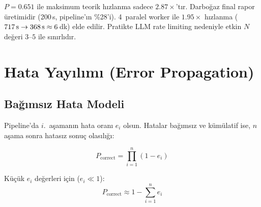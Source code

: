 \begin{dikkat}
$P = 0.651$ ile maksimum teorik h{\i}zlanma sadece $2.87\times$'t{\i}r. Darbo\u{g}az final rapor \"{u}retimidir (200\,s, pipeline'{\i}n \%28'i). 4~paralel worker ile $1.95\times$ h{\i}zlanma ($717\text{\,s} \to 368\text{\,s} \approx 6$\,dk) elde edilir. Pratikte LLM rate limiting nedeniyle etkin $N$ de\u{g}eri $3$--$5$ ile s{\i}n{\i}rl{\i}d{\i}r.
\end{dikkat}


\section{Hata Yay{\i}l{\i}m{\i} (Error Propagation)}
\label{sec:error_propagation}

\subsection{Ba\u{g}{\i}ms{\i}z Hata Modeli}

Pipeline'da $i$.~a\c{s}aman{\i}n hata oran{\i} $e_i$ olsun. Hatalar ba\u{g}{\i}ms{\i}z ve k\"{u}m\"{u}latif ise, $n$ a\c{s}ama sonra hatas{\i}z sonu\c{c} olas{\i}l{\i}\u{g}{\i}:

\begin{formulbox}
\begin{equation}
\label{eq:error_independent}
P_{\text{correct}} = \prod_{i=1}^{n} (1 - e_i)
\end{equation}

K\"{u}\c{c}\"{u}k $e_i$ de\u{g}erleri i\c{c}in ($e_i \ll 1$):
\begin{equation}
\label{eq:error_approx}
P_{\text{correct}} \approx 1 - \sum_{i=1}^{n} e_i
\end{equation}
\end{formulbox}

